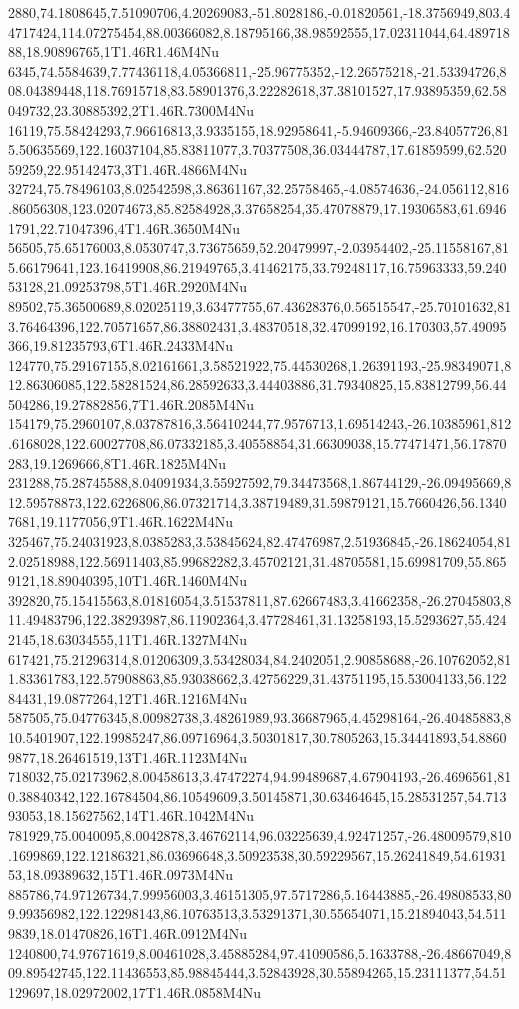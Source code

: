 2880,74.1808645,7.51090706,4.20269083,-51.8028186,-0.01820561,-18.3756949,803.44717424,114.07275454,88.00366082,8.18795166,38.98592555,17.02311044,64.48971888,18.90896765,1T1.46R1.46M4Nu
6345,74.5584639,7.77436118,4.05366811,-25.96775352,-12.26575218,-21.53394726,808.04389448,118.76915718,83.58901376,3.22282618,37.38101527,17.93895359,62.58049732,23.30885392,2T1.46R.7300M4Nu
16119,75.58424293,7.96616813,3.9335155,18.92958641,-5.94609366,-23.84057726,815.50635569,122.16037104,85.83811077,3.70377508,36.03444787,17.61859599,62.52059259,22.95142473,3T1.46R.4866M4Nu
32724,75.78496103,8.02542598,3.86361167,32.25758465,-4.08574636,-24.056112,816.86056308,123.02074673,85.82584928,3.37658254,35.47078879,17.19306583,61.69461791,22.71047396,4T1.46R.3650M4Nu
56505,75.65176003,8.0530747,3.73675659,52.20479997,-2.03954402,-25.11558167,815.66179641,123.16419908,86.21949765,3.41462175,33.79248117,16.75963333,59.24053128,21.09253798,5T1.46R.2920M4Nu
89502,75.36500689,8.02025119,3.63477755,67.43628376,0.56515547,-25.70101632,813.76464396,122.70571657,86.38802431,3.48370518,32.47099192,16.170303,57.49095366,19.81235793,6T1.46R.2433M4Nu
124770,75.29167155,8.02161661,3.58521922,75.44530268,1.26391193,-25.98349071,812.86306085,122.58281524,86.28592633,3.44403886,31.79340825,15.83812799,56.44504286,19.27882856,7T1.46R.2085M4Nu
154179,75.2960107,8.03787816,3.56410244,77.9576713,1.69514243,-26.10385961,812.6168028,122.60027708,86.07332185,3.40558854,31.66309038,15.77471471,56.17870283,19.1269666,8T1.46R.1825M4Nu
231288,75.28745588,8.04091934,3.55927592,79.34473568,1.86744129,-26.09495669,812.59578873,122.6226806,86.07321714,3.38719489,31.59879121,15.7660426,56.13407681,19.1177056,9T1.46R.1622M4Nu
325467,75.24031923,8.0385283,3.53845624,82.47476987,2.51936845,-26.18624054,812.02518988,122.56911403,85.99682282,3.45702121,31.48705581,15.69981709,55.8659121,18.89040395,10T1.46R.1460M4Nu
392820,75.15415563,8.01816054,3.51537811,87.62667483,3.41662358,-26.27045803,811.49483796,122.38293987,86.11902364,3.47728461,31.13258193,15.5293627,55.4242145,18.63034555,11T1.46R.1327M4Nu
617421,75.21296314,8.01206309,3.53428034,84.2402051,2.90858688,-26.10762052,811.83361783,122.57908863,85.93038662,3.42756229,31.43751195,15.53004133,56.12284431,19.0877264,12T1.46R.1216M4Nu
587505,75.04776345,8.00982738,3.48261989,93.36687965,4.45298164,-26.40485883,810.5401907,122.19985247,86.09716964,3.50301817,30.7805263,15.34441893,54.88609877,18.26461519,13T1.46R.1123M4Nu
718032,75.02173962,8.00458613,3.47472274,94.99489687,4.67904193,-26.4696561,810.38840342,122.16784504,86.10549609,3.50145871,30.63464645,15.28531257,54.71393053,18.15627562,14T1.46R.1042M4Nu
781929,75.0040095,8.0042878,3.46762114,96.03225639,4.92471257,-26.48009579,810.1699869,122.12186321,86.03696648,3.50923538,30.59229567,15.26241849,54.6193153,18.09389632,15T1.46R.0973M4Nu
885786,74.97126734,7.99956003,3.46151305,97.5717286,5.16443885,-26.49808533,809.99356982,122.12298143,86.10763513,3.53291371,30.55654071,15.21894043,54.5119839,18.01470826,16T1.46R.0912M4Nu
1240800,74.97671619,8.00461028,3.45885284,97.41090586,5.1633788,-26.48667049,809.89542745,122.11436553,85.98845444,3.52843928,30.55894265,15.23111377,54.51129697,18.02972002,17T1.46R.0858M4Nu

